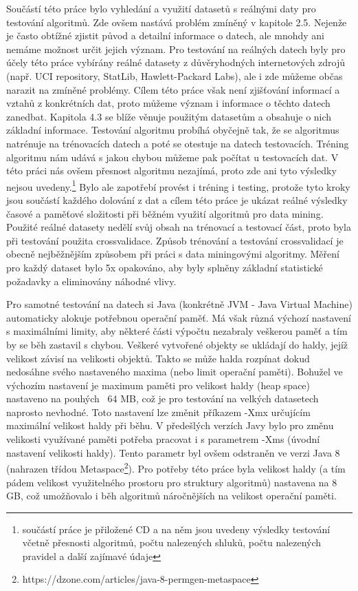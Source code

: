 \documentclass[12pt]{article}
\begin{document}
Součástí této práce bylo vyhledání a využití datasetů s reálnými daty pro testování algoritmů. Zde ovšem nastává problém zmíněný v kapitole 2.5. Nejenže je často obtížné zjistit původ a detailní informace o datech, ale mnohdy ani nemáme možnost určit jejich význam. Pro testování na reálných datech byly pro účely této práce vybírány reálné datasety z důvěryhodných internetových zdrojů (např. UCI repository, StatLib, Hawlett-Packard Labs), ale i zde můžeme občas narazit na zmíněné problémy. Cílem této práce však není zjišťování informací a vztahů z konkrétních dat, proto můžeme význam i informace o těchto datech zanedbat. Kapitola 4.3 se blíže věnuje použitým datasetům a obsahuje o nich základní informace.
\newline
\indent
Testování algoritmu probíhá obyčejně tak, že se algoritmus natrénuje na trénovacích datech a poté se otestuje na datech testovacích. Tréning algoritmu nám udává s jakou chybou můžeme pak počítat u testovacích dat. V této práci nás ovšem přesnost algoritmu nezajímá, proto zde ani tyto výsledky nejsou uvedeny.\footnote{součástí práce je přiložené CD a na něm jsou uvedeny výsledky testování včetně přesnosti algoritmů, počtu nalezených shluků, počtu nalezených pravidel a další zajímavé údaje} Bylo ale zapotřebí provést i tréning i testing, protože tyto kroky jsou součástí každého dolování z dat a cílem této práce je ukázat reálné výsledky časové a paměťové složitosti při běžném využití algoritmů pro data mining. Použité reálné datasety nedělí svůj obsah na trénovací a testovací část, proto byla při testování použita crossvalidace. Způsob trénování a testování crossvalidací je obecně nejběžnějším způsobem při práci s data miningovými algoritmy. Měření pro každý dataset bylo 5x opakováno, aby byly splněny základní statistické požadavky a eliminovány náhodné vlivy. 

Pro samotné testování na datech si Java (konkrétně JVM - Java Virtual Machine) automaticky alokuje potřebnou operační paměť. Má však různá výchozí nastavení s maximálními limity, aby některé části výpočtu nezabraly veškerou paměť a tím by se běh zastavil s chybou. Veškeré vytvořené objekty se ukládají do haldy, jejíž velikost závisí na velikosti objektů. Takto se může halda rozpínat dokud nedosáhne svého nastaveného maxima (nebo limit operační paměti). Bohužel ve výchozím nastavení je maximum paměti pro velikost haldy (heap space) nastaveno na pouhých ~64 MB, což je pro testování na velkých datasetech naprosto nevhodné. Toto nastavení lze změnit příkazem -Xmx určujícím maximální velikost haldy při běhu. V předešlých verzích Javy bylo pro změnu velikosti využívané paměti potřeba pracovat i s parametrem -Xms (úvodní nastavení velikosti haldy). Tento parametr byl ovšem odstraněn ve verzi Java 8 (nahrazen třídou Metaspace\footnote{https://dzone.com/articles/java-8-permgen-metaspace}).  
\newline
\indent
Pro potřeby této práce byla velikost haldy (a tím pádem velikost využitelného prostoru pro struktury algoritmů) nastavena na 8 GB, což umožňovalo i běh algoritmů náročnějších na velikost operační paměti. 
\end{document}
